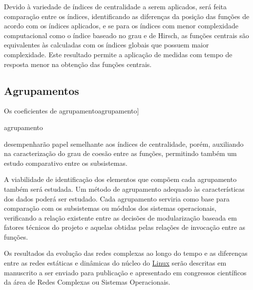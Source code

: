 \documentclass[a4paper,12pt,twoside]{article}
\def\linux{\href{http://www.kernel.org/}{\sc Linux}}
\renewcommand\marginpar[1]{}
\let\oldmarginpar\marginpar
\renewcommand\marginpar[1]{\-\oldmarginpar[\raggedleft\footnotesize #1]%
{\raggedright\footnotesize #1}}
\begin{document}
Devido à variedade de índices de centralidade a serem aplicados, será
feita comparação entre os índices, identificando as diferenças da
posição das funções de acordo com os índices aplicados, e se para os
índices com menor complexidade computacional como o índice baseado no
grau e de Hirsch, as funções centrais são equivalentes às calculadas
com os índices globais que possuem maior complexidade. Este resultado
permite a aplicação de medidas com tempo de resposta menor na obtenção
das funções centrais.

\subsection{Agrupamentos}

Os coeficientes de agrupamento\marginpar{agrupamento} desempenharão
papel semelhante aos índices de centralidade, porém, auxiliando na
caracterização do grau de coesão entre as funções, permitindo também
um estudo comparativo entre os subsistemas.

A viabilidade de identificação dos elementos que compõem cada
agrupamento também será estudada. Um método de agrupamento adequado às
características dos dados poderá ser estudado. Cada agrupamento
serviria como base para comparação com os subsistemas ou módulos dos
sistemas operacionais, verificando a relação existente entre as
decisões de modularização baseada em fatores técnicos do projeto e
aquelas obtidas pelas relações de invocação entre as funções.

Os resultados da evolução das redes complexas ao longo do tempo e as
diferenças entre as redes estáticas e dinâmicas do núcleo do \linux{}
serão descritas em manuscrito a ser enviado para publicação e
apresentado em congressos científicos da área de Redes Complexas ou
Sistemas Operacionais.



\end{document}
